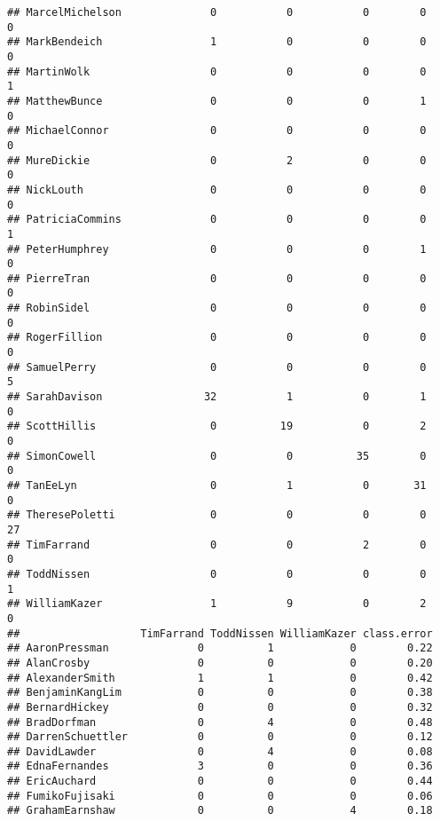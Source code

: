 \documentclass[
  12pt,
]{article}
\begin{document}
\begin{verbatim}
## MarcelMichelson              0           0           0        0              0
## MarkBendeich                 1           0           0        0              0
## MartinWolk                   0           0           0        0              1
## MatthewBunce                 0           0           0        1              0
## MichaelConnor                0           0           0        0              0
## MureDickie                   0           2           0        0              0
## NickLouth                    0           0           0        0              0
## PatriciaCommins              0           0           0        0              1
## PeterHumphrey                0           0           0        1              0
## PierreTran                   0           0           0        0              0
## RobinSidel                   0           0           0        0              0
## RogerFillion                 0           0           0        0              0
## SamuelPerry                  0           0           0        0              5
## SarahDavison                32           1           0        1              0
## ScottHillis                  0          19           0        2              0
## SimonCowell                  0           0          35        0              0
## TanEeLyn                     0           1           0       31              0
## TheresePoletti               0           0           0        0             27
## TimFarrand                   0           0           2        0              0
## ToddNissen                   0           0           0        0              1
## WilliamKazer                 1           9           0        2              0
##                   TimFarrand ToddNissen WilliamKazer class.error
## AaronPressman              0          1            0        0.22
## AlanCrosby                 0          0            0        0.20
## AlexanderSmith             1          1            0        0.42
## BenjaminKangLim            0          0            0        0.38
## BernardHickey              0          0            0        0.32
## BradDorfman                0          4            0        0.48
## DarrenSchuettler           0          0            0        0.12
## DavidLawder                0          4            0        0.08
## EdnaFernandes              3          0            0        0.36
## EricAuchard                0          0            0        0.44
## FumikoFujisaki             0          0            0        0.06
## GrahamEarnshaw             0          0            4        0.18

\end{verbatim}
\end{document}
